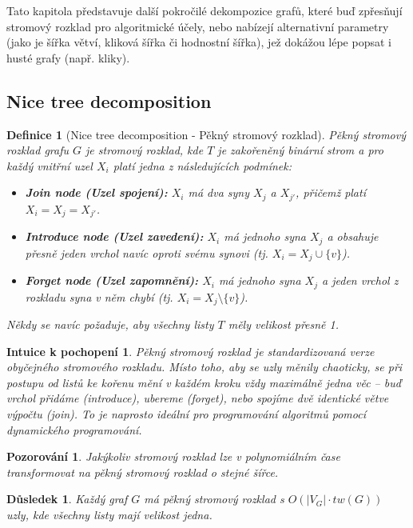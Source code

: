 \documentclass[a4paper,11pt]{article}
\newtheorem{definition}{Definice}[section]
\newtheorem{corollary}{Důsledek}[section]
\newtheorem{observation}{Pozorování}[section]
\newtheorem*{intuition}{Intuice k pochopení}
\begin{document}
Tato kapitola představuje další pokročilé dekompozice grafů, které buď zpřesňují stromový rozklad pro algoritmické účely, nebo nabízejí alternativní parametry (jako je šířka větví, kliková šířka či hodnostní šířka), jež dokážou lépe popsat i husté grafy (např. kliky).

\subsection{Nice tree decomposition}

\begin{definition}[Nice tree decomposition - Pěkný stromový rozklad]
Pěkný stromový rozklad grafu $G$ je stromový rozklad, kde $T$ je zakořeněný binární strom a pro každý vnitřní uzel $X_i$ platí jedna z následujících podmínek:
\begin{itemize}
    \item \textbf{Join node (Uzel spojení):} $X_i$ má dva syny $X_j$ a $X_{j'}$, přičemž platí $X_i = X_j = X_{j'}$.
    \item \textbf{Introduce node (Uzel zavedení):} $X_i$ má jednoho syna $X_j$ a obsahuje přesně jeden vrchol navíc oproti svému synovi (tj. $X_i = X_j \cup \{v\}$).
    \item \textbf{Forget node (Uzel zapomnění):} $X_i$ má jednoho syna $X_j$ a jeden vrchol z rozkladu syna v něm chybí (tj. $X_i = X_j \setminus \{v\}$).
\end{itemize}
Někdy se navíc požaduje, aby všechny listy $T$ měly velikost přesně 1.
\end{definition}

\begin{intuition}
Pěkný stromový rozklad je standardizovaná verze obyčejného stromového rozkladu. Místo toho, aby se uzly měnily chaoticky, se při postupu od listů ke kořenu mění v každém kroku vždy maximálně jedna věc – buď vrchol přidáme (introduce), ubereme (forget), nebo spojíme dvě identické větve výpočtu (join). To je naprosto ideální pro programování algoritmů pomocí dynamického programování.
\end{intuition}

\begin{observation}
Jakýkoliv stromový rozklad lze v polynomiálním čase transformovat na pěkný stromový rozklad o stejné šířce.
\end{observation}

\begin{corollary}
Každý graf $G$ má pěkný stromový rozklad s $O(|V_G| \cdot tw(G))$ uzly, kde všechny listy mají velikost jedna.
\end{corollary}
\end{document}
